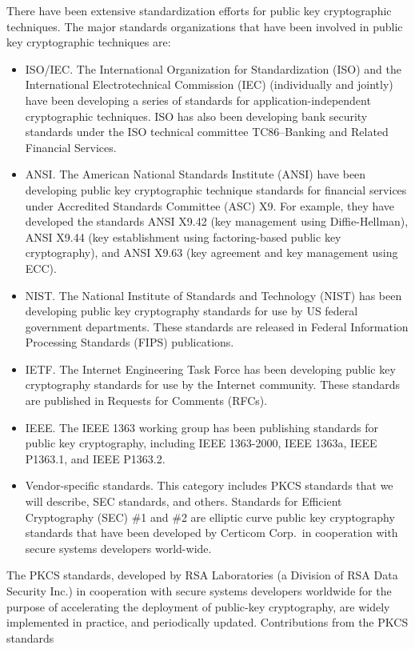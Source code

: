 \documentclass{article}
\begin{document}
There have been extensive standardization efforts for 
public key cryptographic techniques. The major standards organizations that 
have been involved in public key cryptographic techniques are:
\begin{itemize}
\item ISO/IEC. The International Organization for Standardization (ISO)
and the International Electrotechnical Commission (IEC) 
(individually and jointly) have been developing a series of standards 
for application-independent cryptographic techniques. ISO has 
also been developing
bank security standards under the ISO technical committee TC86--Banking
and Related Financial Services.
\item ANSI. The American National Standards Institute (ANSI) have been
developing public key cryptographic technique standards for financial
services under Accredited Standards Committee (ASC) X9. For example,
they have developed the standards ANSI X9.42 (key management
using Diffie-Hellman), ANSI X9.44 (key establishment using factoring-based
public key cryptography), and ANSI X9.63
(key agreement and key management using ECC).
\item NIST. The National Institute of Standards and Technology
(NIST) has been developing public key cryptography standards for use
by US federal government departments. These standards are released
in Federal Information Processing Standards (FIPS) publications.
\item IETF. The Internet Engineering Task Force has been developing
public key cryptography standards for use by the Internet community.
These standards are published in Requests for Comments (RFCs).
\item IEEE. The IEEE 1363 working group has been publishing standards
for public key cryptography, including IEEE 1363-2000, IEEE 1363a,
IEEE P1363.1, and IEEE P1363.2.
\item Vendor-specific standards. This category includes PKCS standards
that we will describe, SEC standards, and others. 
Standards for Efficient Cryptography (SEC) \#1 and \#2 are 
elliptic curve public key cryptography standards that have been developed 
by Certicom Corp.~in cooperation with secure systems developers world-wide. 
\end{itemize}
The PKCS standards, developed by RSA Laboratories 
(a Division of RSA Data Security Inc.) in cooperation with secure 
systems developers worldwide for the purpose of accelerating the 
deployment of public-key cryptography, are widely implemented in practice, 
and periodically updated. Contributions from the PKCS standards
\end{document}
